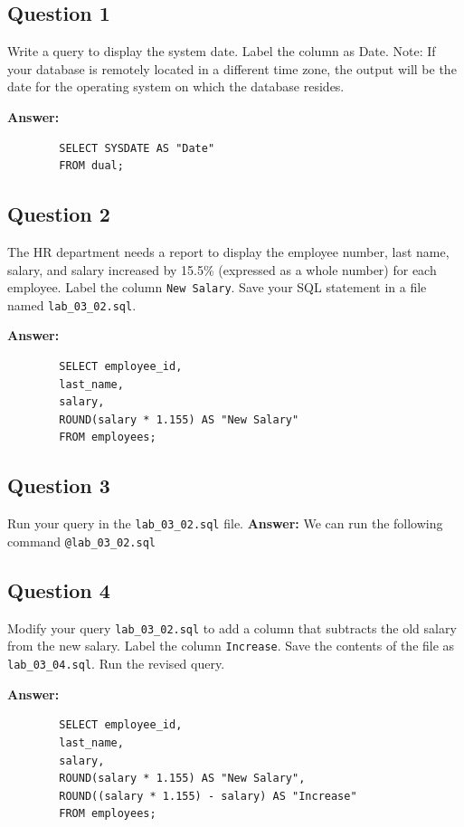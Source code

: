 \documentclass[12pt,a4paper]{article}
\begin{document}
\subsection*{Question 1}
Write a query to display the system date. Label the column as Date.
Note: If your database is remotely located in a different time zone, the output will be the date 
for the operating system on which the database resides.

\textbf{Answer:}
    \begin{lstlisting}
        SELECT SYSDATE AS "Date"
        FROM dual;
    \end{lstlisting}

\subsection*{Question 2}
The HR department needs a report to display the employee number, last name, salary, and 
salary increased by 15.5\% (expressed as a whole number) for each employee. Label the column 
\texttt{New Salary}. Save your SQL statement in a file named \texttt{lab\_03\_02.sql}.

\textbf{Answer:}
    \begin{lstlisting}
        SELECT employee_id,
        last_name,
        salary,
        ROUND(salary * 1.155) AS "New Salary"
        FROM employees;
    \end{lstlisting}

\subsection*{Question 3}
Run your query in the \texttt{lab\_03\_02.sql} file.
\textbf{Answer:}
        We can run the following command\: \texttt{@lab\_03\_02.sql}

\subsection*{Question 4}
Modify your query \texttt{lab\_03\_02.sql} to add a column that subtracts the old salary from the 
new salary. Label the column \texttt{Increase}. Save the contents of the file as \texttt{lab\_03\_04.sql}. 
Run the revised query.

\textbf{Answer:}
    \begin{lstlisting}
        SELECT employee_id,
        last_name,
        salary,
        ROUND(salary * 1.155) AS "New Salary",
        ROUND((salary * 1.155) - salary) AS "Increase"
        FROM employees;
    \end{lstlisting}
\end{document}
